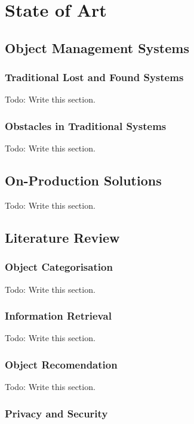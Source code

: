 
\chapter{State of Art}
\label{chapter:state_of_art}

\section{Object Management Systems}

\subsection{Traditional Lost and Found Systems}

Todo: Write this section.

\subsection{Obstacles in Traditional Systems}

Todo: Write this section.

\section{On-Production Solutions}

Todo: Write this section.

\section{Literature Review}

\subsection{Object Categorisation}

Todo: Write this section.

\subsection{Information Retrieval}

Todo: Write this section.

\subsection{Object Recomendation}

Todo: Write this section.

\subsection{Privacy and Security}

